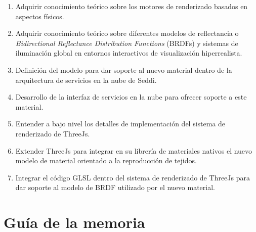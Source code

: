 \begin{enumerate}[label=\arabic*)]
	\item Adquirir conocimiento te\'orico sobre los motores de renderizado basados en aspectos f\'isicos.
    \item Adquirir conocimiento te\'orico sobre diferentes modelos de reflectancia o\\
    \textit{Bidirectional Reflectance Distribution Functions} (BRDFs)
    y sistemas de iluminaci\'on global en entornos interactivos de visualizaci\'on hiperrealista.
    \item Definici\'on del modelo para dar soporte al nuevo material dentro de la arquitectura de servicios en
    la nube de Seddi.
	\item Desarrollo de la interfaz de servicios en la nube para ofrecer soporte a este material.
	\item Entender a bajo nivel los detalles de implementaci\'on del sistema de renderizado de ThreeJs.
  \item Extender ThreeJs para integrar en su librer\'ia de materiales nativos el nuevo modelo de material orientado
  a la reproducci\'on de tejidos.
	\item Integrar el c\'odigo GLSL dentro del sistema de renderizado de ThreeJs para dar soporte al modelo de BRDF
	utilizado por el nuevo material.
\end{enumerate}


\section{Gu\'ia de la memoria}

